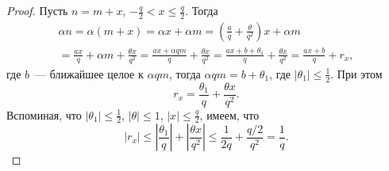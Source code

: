 \documentclass[12pt,a4paper]{article}
\begin{document}
    \begin{proof}
        Пусть $n = m + x$, $-\frac{q}{2} < x \leqslant \frac{q}{2}$. Тогда
        \begin{multline*}
            \alpha n
            = \alpha (m + x)
            = \alpha x + \alpha m
            = \left(\frac{a}{q} + \frac{\theta}{q^2}\right)x + \alpha m\\
            = \frac{ax}{q} + \alpha m + \frac{\theta x}{q^2}
            = \frac{ax + \alpha qm}{q} + \frac{\theta x}{q^2}
            = \frac{ax+b+\theta_1}{q} + \frac{\theta x}{q^2}
            = \frac{ax+b}{q} + r_x,
        \end{multline*}
        где $b$~--- ближайшее целое к $\alpha qm$, тогда $\alpha qm = b + \theta_1$, где $|\theta_1| \leqslant \frac{1}{2}$. При этом
        \[r_x = \frac{\theta_1}{q} + \frac{\theta x}{q^2}.\]
        Вспоминая, что $|\theta_1| \leqslant \frac{1}{2}$, $|\theta| \leqslant 1$, $|x| \leqslant \frac{q}{2}$, имеем, что
        \[
            |r_x|
            \leqslant \left|\frac{\theta_1}{q}\right| + \left|\frac{\theta x}{q^2}\right|
            \leqslant \frac{1}{2q} + \frac{q/2}{q^2}
            = \frac{1}{q}.
        \]
        

\end{proof}
\end{document}
